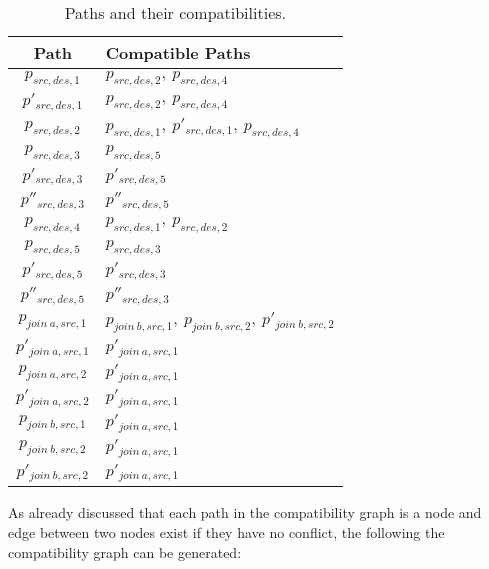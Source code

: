 \documentclass[conference]{IEEEtran}
\begin{document}
\begin{table}[h!]
\centering
\renewcommand{\arraystretch}{1.4}
\begin{tabular}{|c|p{6cm}|}
\hline
\textbf{Path} & \textbf{Compatible Paths} \\
\hline
$\mathit{p_{src,des,1}}$ & $\mathit{p_{src,des,2}},\ \mathit{p_{src,des,4}}$ \\
$\mathit{p'_{src,des,1}}$ & $\mathit{p_{src,des,2}},\ \mathit{p_{src,des,4}}$ \\
$\mathit{p_{src,des,2}}$ & $\mathit{p_{src,des,1}},\ \mathit{p'_{src,des,1}},\ \mathit{p_{src,des,4}}$ \\
$\mathit{p_{src,des,3}}$ & $\mathit{p_{src,des,5}}$ \\
$\mathit{p'_{src,des,3}}$ & $\mathit{p'_{src,des,5}}$ \\
$\mathit{p''_{src,des,3}}$ & $\mathit{p''_{src,des,5}}$ \\
$\mathit{p_{src,des,4}}$ & $\mathit{p_{src,des,1}},\ \mathit{p_{src,des,2}}$ \\
$\mathit{p_{src,des,5}}$ & $\mathit{p_{src,des,3}}$ \\
$\mathit{p'_{src,des,5}}$ & $\mathit{p'_{src,des,3}}$ \\
$\mathit{p''_{src,des,5}}$ & $\mathit{p''_{src,des,3}}$ \\
$\mathit{p_{join\ a,src,1}}$ & $\mathit{p_{join\ b,src,1}},\ \mathit{p_{join\ b,src,2}},\ \mathit{p'_{join\ b,src,2}}$ \\
$\mathit{p'_{join\ a,src,1}}$ & $\mathit{p'_{join\ a,src,1}}$ \\
$\mathit{p_{join\ a,src,2}}$ & $\mathit{p'_{join\ a,src,1}}$ \\
$\mathit{p'_{join\ a,src,2}}$ & $\mathit{p'_{join\ a,src,1}}$ \\
$\mathit{p_{join\ b,src,1}}$ & $\mathit{p'_{join\ a,src,1}}$ \\
$\mathit{p_{join\ b,src,2}}$ & $\mathit{p'_{join\ a,src,1}}$ \\
$\mathit{p'_{join\ b,src,2}}$ & $\mathit{p'_{join\ a,src,1}}$ \\
\hline
\end{tabular}
\vspace{0.5em}
\caption{Paths and their compatibilities.}
\end{table}

As already discussed that each path in the compatibility graph is a node and edge between two nodes exist if they have no conflict, the following the compatibility graph can be generated:
\end{document}

